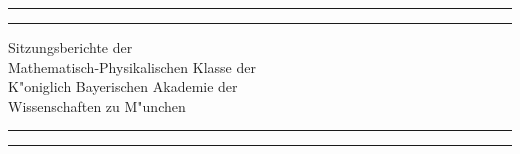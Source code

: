 \documentclass[a4paper, 11pt, oneside]{article}
\begin{document}
\swabfamily
\renewcommand{\contentsname}{
\swabfamily{Inhaltsverzeichnis}
}
\let\origcftsecfont\cft
\let\origcftsecpagefont\cftsecpagefont
\let\origcftsecafterpnum\cftsecafterpnum
\renewcommand{\cftsecpagefont}{\swabfamily{\origcftsecpagefont}}
\renewcommand{\cftsecafterpnum}{\swabfamily{\origcftsecafterpnum}}
\let\origcftsubsecpagefont\cftsubsecpagefont
\let\origcftsubsecafterpnum\cftsubsecafterpnum
\renewcommand{\cftsubsecpagefont}{\swabfamily{\origcftsubsecpagefont}}
\renewcommand{\cftsubsecafterpnum}{\swabfamily{\origcftsubsecafterpnum}}
\let\origcftsubsubsecpagefont\cftsubsubsecpagefont
\let\origcftsubsubsecafterpnum\cftsubsubsecafterpnum
\renewcommand{\cftsubsubsecpagefont}{\swabfamily{\origcftsubsubsecpagefont}}
\renewcommand{\cftsubsubsecafterpnum}{\swabfamily{\origcftsubsubsecafterpnum}}
\begin{titlepage} %
	\centering %

	
	\rule{\textwidth}{1.6pt}\vspace*{-\baselineskip}\vspace*{2pt} %
	\rule{\textwidth}{0.4pt} %
	
	\vspace{1\baselineskip} %
	
	{\Huge Sitzungsberichte der\\[1.25pt] Mathematisch-Physikalischen Klasse der\\[1.25pt] K"oniglich Bayerischen Akademie der\\[1.25pt] Wissenschaften zu M"unchen\\[1.25pt]}
	
	\vspace{1\baselineskip} %

	\rule{\textwidth}{0.4pt}\vspace*{-\baselineskip}\vspace{3.2pt} %
	\rule{\textwidth}{1.6pt} %
	
	\vspace{1\baselineskip} %
	
	

\end{titlepage}
\end{document}
